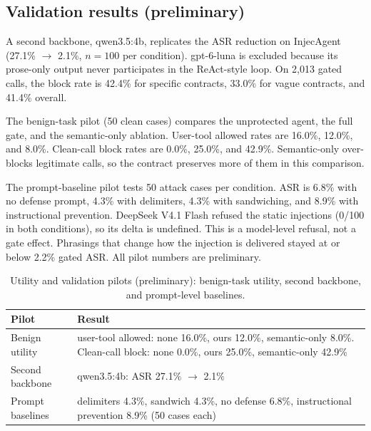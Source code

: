 \documentclass[a4paper,conference]{IEEEtran}
\begin{document}
\subsection{Validation results (preliminary)}
\label{sec:validation}
A second backbone, qwen3.5:4b, replicates the ASR reduction on InjecAgent (27.1\% $\rightarrow$ 2.1\%, $n=100$ per condition). gpt-6-luna is excluded because its prose-only output never participates in the ReAct-style loop. On 2,013 gated calls, the block rate is 42.4\% for specific contracts, 33.0\% for vague contracts, and 41.4\% overall.

The benign-task pilot (50 clean cases) compares the unprotected agent, the full gate, and the semantic-only ablation. User-tool allowed rates are 16.0\%, 12.0\%, and 8.0\%. Clean-call block rates are 0.0\%, 25.0\%, and 42.9\%. Semantic-only over-blocks legitimate calls, so the contract preserves more of them in this comparison.

The prompt-baseline pilot tests 50 attack cases per condition. ASR is 6.8\% with no defense prompt, 4.3\% with delimiters, 4.3\% with sandwiching, and 8.9\% with instructional prevention. DeepSeek V4.1 Flash refused the static injections (0/100 in both conditions), so its delta is undefined. This is a model-level refusal, not a gate effect. Phrasings that change how the injection is delivered stayed at or below 2.2\% gated ASR. All pilot numbers are preliminary.

\begin{table}[t]
  \caption{Utility and validation pilots (preliminary): benign-task utility, second backbone, and prompt-level baselines.}
  \label{tab:validation}
  \centering
  \footnotesize
  \setlength{\tabcolsep}{4pt}
  \begin{tabular}{|l|p{142pt}|}
    \hline
    Pilot            & Result                                                                                                                            \\
    \hline
    Benign utility   & user-tool allowed: none 16.0\%, ours 12.0\%, semantic-only 8.0\%. Clean-call block: none 0.0\%, ours 25.0\%, semantic-only 42.9\% \\
    \hline
    Second backbone  & qwen3.5:4b: ASR 27.1\% $\rightarrow$ 2.1\%                                                                                        \\
    \hline
    Prompt baselines & delimiters 4.3\%, sandwich 4.3\%, no \mbox{defense} 6.8\%, instructional prevention 8.9\% (50 cases each)                         \\
    \hline
  \end{tabular}
\end{table}
\end{document}
